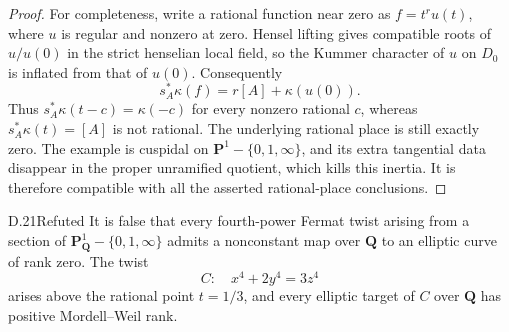 \begin{proof}
For completeness, write a rational function near zero as
$f=t^r u(t)$, where $u$ is regular and nonzero at zero. Hensel lifting
gives compatible roots of $u/u(0)$ in the strict henselian local field,
so the Kummer character of $u$ on $D_0$ is inflated from that of $u(0)$.
Consequently
\[
 s_A^*\kappa(f)=r[A]+\kappa(u(0)).
\]
Thus $s_A^*\kappa(t-c)=\kappa(-c)$ for every nonzero rational $c$,
whereas $s_A^*\kappa(t)=[A]$ is not rational. The underlying rational
place is still exactly zero. The example is cuspidal on
$\mathbf P^1-\{0,1,\infty\}$, and its extra tangential data disappear
in the proper unramified quotient, which kills this inertia. It is
therefore compatible with all the asserted rational-place conclusions.
\end{proof}

\begin{claim}{D.21}{Refuted}\label{clm:D21}
It is false that every fourth-power Fermat twist arising from a section
of $\mathbf P^1_{\mathbf Q}-\{0,1,\infty\}$ admits a nonconstant map
over $\mathbf Q$ to an elliptic curve of rank zero. The twist
\[
 C:\quad x^4+2y^4=3z^4
\]
arises above the rational point $t=1/3$, and every elliptic target of
$C$ over $\mathbf Q$ has positive Mordell--Weil rank.
\end{claim}
